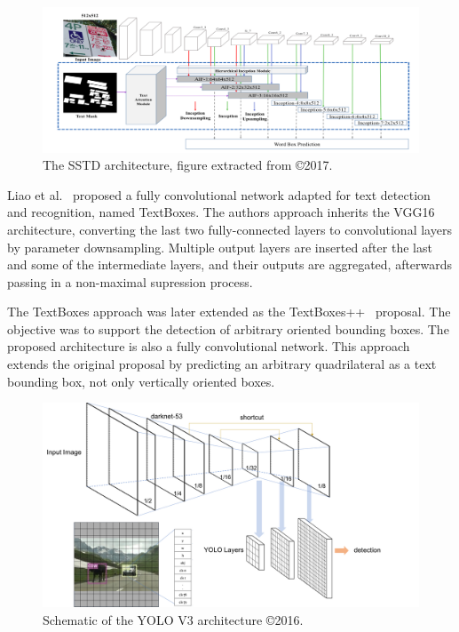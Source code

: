         \begin{figure}[!ht]
            \centering
        	\includegraphics[width=\textwidth]{related_work/figs/SSTD_ARCH.png}
        	\caption{The SSTD architecture, figure extracted from \cite{He2017ICCV}©2017.}
        	\label{fig:sstd_arch}
        \end{figure}
        
        
        
        Liao et al.~\cite{Liao2017AAAI} proposed a fully convolutional network adapted for text detection and recognition, named TextBoxes. The authors approach inherits the VGG16~\cite{vgg} architecture, converting the last two fully-connected layers to convolutional layers by parameter downsampling. Multiple output layers are inserted after the last and some of the intermediate layers, and their outputs are aggregated, afterwards passing in a non-maximal supression process.
        
        The TextBoxes approach was later extended as the TextBoxes++~\cite{Liao2018TIP} proposal. The objective was to support the detection of arbitrary oriented bounding boxes. The proposed architecture is also a fully convolutional network. This approach extends the original proposal by predicting an arbitrary quadrilateral as a text bounding box, not only vertically oriented boxes.
        
        \begin{figure}[!ht]
            \centering
        	\includegraphics[width=\textwidth]{related_work/figs/YOLOV3.png}
        	\caption{Schematic of the YOLO V3 architecture ©2016.}
        	\label{fig:yolov3_arch}
        \end{figure}
        
